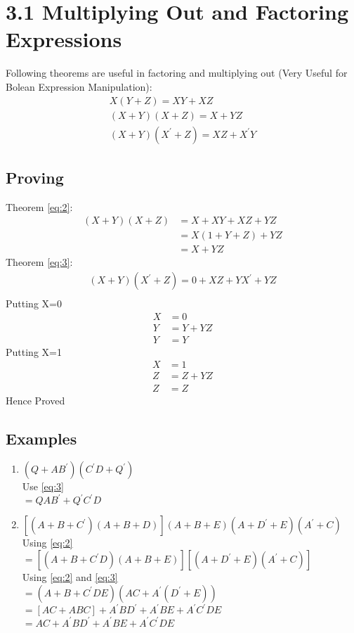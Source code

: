 \section*{3.1 Multiplying Out and Factoring Expressions}
Following theorems are useful in factoring and multiplying out (Very Useful for Bolean Expression Manipulation):
\begin{align}
    X(Y + Z) = XY + XZ\\
    (X + Y)(X + Z) = X + YZ \label{eq:2}\\
    (X+Y)(X^\prime+Z)=XZ+X^\prime Y \label{eq:3}
\end{align}
\subsection*{Proving}
Theorem \ref{eq:2}:
\begin{align*}
    (X + Y)(X + Z)&=X+XY+XZ+YZ\\
    &=X(1+Y+Z)+YZ\\
    &=X+YZ
\end{align*}
Theorem \ref{eq:3}:
\begin{align*}
    (X+Y)(X^\prime+Z)=0+XZ+YX^\prime + YZ\\
\end{align*}
Putting X=0
\begin{align*}
    X&=0\\
    Y&=Y+YZ\\
    Y&=Y
\end{align*}
Putting X=1
\begin{align*}
    X&=1\\
    Z&=Z+YZ\\
    Z&=Z
\end{align*}
Hence Proved\\
\subsection*{Examples}
\begin{enumerate}
    \item $(Q + AB^\prime)(C^\prime D + Q^\prime)$\\
    Use \ref{eq:3}\\
    $= QAB^\prime+Q^\prime C^\prime D$
    \item $[(A + B + C^\prime)(A + B + D)](A + B + E)(A + D^\prime + E)(A^\prime + C)$\\
    Using \ref{eq:2}\\
    $=[(A + B + C^\prime D)(A + B + E)][(A + D^\prime + E)(A^\prime + C)]$\\
    Using \ref{eq:2} and \ref{eq:3}\\
    $=(A+B+C^\prime DE)(AC+A^\prime(D^\prime+E))$\\
    $=[AC+ABC]+A^\prime BD^\prime +A^\prime BE+ A^\prime C^\prime DE$\\
    $=AC+A^\prime BD^\prime +A^\prime BE+ A^\prime C^\prime DE$    
\end{enumerate}
